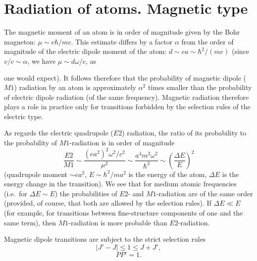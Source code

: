 \section{Radiation of atoms. Magnetic type}

The magnetic moment of an atom is in order of magnitude given by the Bohr magneton: $\mu \sim e\hbar/mc$. This estimate differs by a factor $\alpha$ from the order of magnitude of the electric dipole moment of the atom: $d \sim ea \sim \hbar^2/(me)$ (since $v/c \sim \alpha$, we have $\mu \sim d\omega/c$, as

one would expect). It follows therefore that the probability of magnetic dipole ($M1$) radiation by an atom is approximately $\alpha^2$ times smaller than the probability of electric dipole radiation (of the same frequency). Magnetic radiation therefore plays a role in practice only for transitions forbidden by the selection rules of the electric type.

As regards the electric quadrupole ($E2$) radiation, the ratio of its probability to the probability of $M1$-radiation is in order of magnitude
\begin{equation}
\frac{E2}{M1} \sim \frac{(ea^2)^2\omega^2/c^2}{\mu^2} \sim \frac{a^4m^2\omega^2}{\hbar^2} \sim \left(\frac{\Delta E}{E}\right)^{\!2}
\tag{50.1}
\end{equation}
(quadrupole moment $\sim ea^2$, $E \sim \hbar^2/ma^2$ is the energy of the atom, $\Delta E$ is the energy change in the transition). We see that for medium atomic frequencies (i.e.\ for $\Delta E \sim E$) the probabilities of $E2$- and $M1$-radiation are of the same order (provided, of course, that both are allowed by the selection rules). If $\Delta E \ll E$ (for example, for transitions between fine-structure components of one and the same term), then $M1$-radiation is more probable than $E2$-radiation.

Magnetic dipole transitions are subject to the strict selection rules
\begin{equation}
|J' - J| \leqslant 1 \leqslant J + J',
\tag{50.2}
\end{equation}
\begin{equation}
PP' = 1.
\tag{50.3}
\end{equation}

